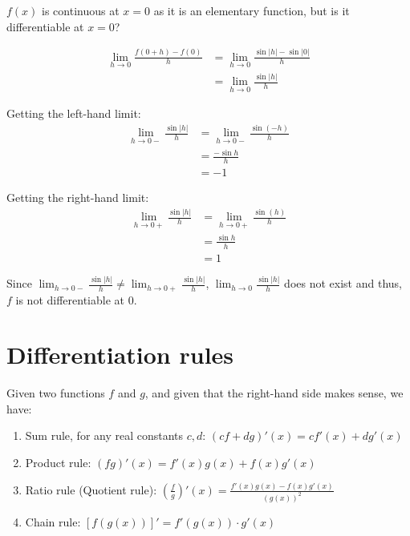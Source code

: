 \documentclass[11pt]{article}
\begin{document}
\(f(x)\) is continuous at \(x = 0\) as it is an elementary function, but is it differentiable at \(x = 0\)?

\begin{align*}
\lim_{h \rightarrow 0} \frac{f(0 + h) - f(0)}{h} &= \lim_{h \rightarrow 0} \frac{\sin |h| - \sin |0|}{h} \\
&= \lim_{h \rightarrow 0} \frac{\sin |h|}{h}
\end{align*}

Getting the left-hand limit:
\begin{align*}
\lim_{h \rightarrow 0-} \frac{\sin |h|}{h} &= \lim_{h \rightarrow 0-} \frac{\sin (-h)}{h} \\
&= \frac{- \sin h}{h} \\
&= -1
\end{align*}

Getting the right-hand limit:
\begin{align*}
\lim_{h \rightarrow 0+} \frac{\sin |h|}{h} &= \lim_{h \rightarrow 0+} \frac{\sin (h)}{h} \\
&= \frac{\sin h}{h} \\
&= 1
\end{align*}

\newpage

\begin{center}
\end{center}

Since \(\lim_{h \rightarrow 0-} \frac{\sin |h|}{h} \neq \lim_{h \rightarrow 0+} \frac{\sin |h|}{h}\), \(\lim_{h \rightarrow 0} \frac{\sin |h|}{h}\) does not exist and thus, \(f\) is not differentiable at 0.

\newpage

\section{Differentiation rules}
\label{sec:org644739e}
Given two functions \(f\) and \(g\), and given that the right-hand side makes sense, we have:

\begin{enumerate}
\item Sum rule, for any real constants \(c, d\): \((cf + dg)'(x) = cf'(x) + dg'(x)\)
\item Product rule: \((fg)'(x) = f'(x)g(x) + f(x)g'(x)\)
\item Ratio rule (Quotient rule): \(\left( \frac{f}{g} \right)'(x) = \frac{f'(x)g(x) - f(x) g'(x)}{(g(x))^2}\)
\item Chain rule: \([f(g(x))]' = f'(g(x)) \cdot g'(x)\)
\end{enumerate}
\end{document}

